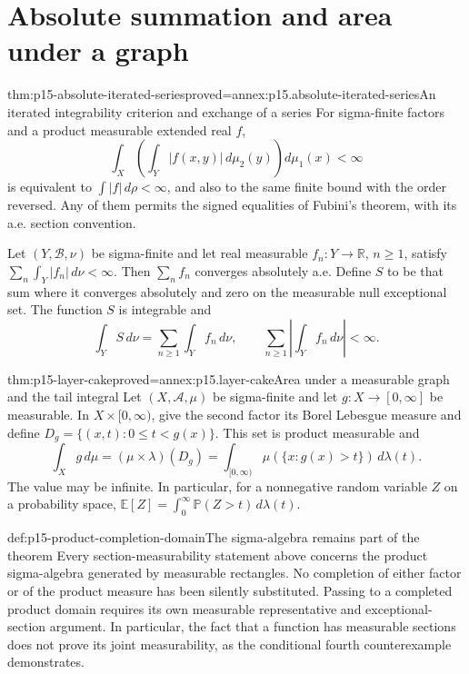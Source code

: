 \section{Absolute summation and area under a graph}
\label{sec:p15-product-corollaries}

\begin{hbcorollary}{thm:p15-absolute-iterated-series}{proved=annex:p15.absolute-iterated-series}{An iterated integrability criterion and exchange of a series}
For sigma-finite factors and a product measurable extended real \(f\),
\[
 \int_X\left(\int_Y|f(x,y)|\,d\mu_2(y)\right)d\mu_1(x)<\infty
\]
is equivalent to \(\int|f|\,d\rho<\infty\), and also to the
same finite bound with the order reversed. Any of them permits the
signed equalities of Fubini's theorem, with its a.e. section convention.

Let \((Y,\mathcal B,\nu)\) be sigma-finite and let real measurable
\(f_n:Y\to\mathbb R\), \(n\geq1\), satisfy
\(\sum_n\int_Y|f_n|\,d\nu<\infty\). Then \(\sum_n f_n\)
converges absolutely a.e. Define \(S\) to be that sum where it
converges absolutely and zero on the measurable null exceptional set.
The function \(S\) is integrable and
\[
 \int_Y S\,d\nu=\sum_{n\geq1}\int_Y f_n\,d\nu,
 \qquad
 \sum_{n\geq1}\left|\int_Y f_n\,d\nu\right|<\infty.
\]
\end{hbcorollary}

\begin{hbcorollary}{thm:p15-layer-cake}{proved=annex:p15.layer-cake}{Area under a measurable graph and the tail integral}
Let \((X,\mathcal A,\mu)\) be sigma-finite and let
\(g:X\to[0,\infty]\) be measurable. In
\(X\times[0,\infty)\), give the second factor its Borel
Lebesgue measure and define
\(D_g=\{(x,t):0\leq t<g(x)\}\). This set is product measurable and
\[
 \int_X g\,d\mu
   =(\mu\times\lambda)(D_g)
   =\int_{[0,\infty)}\mu(\{x:g(x)>t\})\,d\lambda(t).
\]
The value may be infinite. In particular, for a nonnegative random
variable \(Z\) on a probability space,
\(\mathbb E[Z]=\int_0^\infty\mathbb P(Z>t)\,d\lambda(t)\).
\end{hbcorollary}

\begin{hbwarning}{def:p15-product-completion-domain}{The sigma-algebra remains part of the theorem}
Every section-measurability statement above concerns the product
sigma-algebra generated by measurable rectangles. No completion of
either factor or of the product measure has been silently substituted.
Passing to a completed product domain requires its own measurable
representative and exceptional-section argument. In particular, the
fact that a function has measurable sections does not prove its joint
measurability, as the conditional fourth counterexample demonstrates.
\end{hbwarning}

